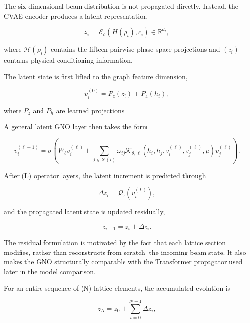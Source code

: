 The six-dimensional beam distribution is not propagated directly. Instead, the CVAE encoder produces a latent representation

\begin{equation}
\label{eq:119}
z_i=\mathcal E_{\phi}(H(\rho_i),c_i)\in\mathbb R^{d_z},
\end{equation}

where \(\mathcal{H} ( \rho_{i} )\) contains the fifteen pairwise phase-space projections and \(( c_{i} )\) contains physical conditioning information.

The latent state is first lifted to the graph feature dimension,

\begin{equation}
\label{eq:120}
v_i^{(0)}=P_z(z_i)+P_h(h_i),
\end{equation}

where \(P_{z}\) and \(P_{h}\) are learned projections.

A general latent GNO layer then takes the form

\begin{equation}
\label{eq:121}
v_i^{(\ell+1)}=\sigma\left(W_{\ell}v_i^{(\ell)}+\sum_{j\in\mathcal N(i)}\omega_{ij}\mathcal K_{\theta,\ell}(h_i,h_j,v_i^{(\ell)},v_j^{(\ell)},\mu)v_j^{(\ell)}\right).
\end{equation}

After (L) operator layers, the latent increment is predicted through

\begin{equation}
\label{eq:122}
\Delta z_i=\mathcal Q_z\left(v_i^{(L)}\right),
\end{equation}

and the propagated latent state is updated residually,

\begin{equation}
\label{eq:123}
z_{i+1}=z_i+\Delta z_i.
\end{equation}

The residual formulation is motivated by the fact that each lattice section modifies, rather than reconstructs from scratch, the incoming beam state. It also makes the GNO structurally comparable with the Transformer propagator used later in the model comparison.

For an entire sequence of (N) lattice elements, the accumulated evolution is

\begin{equation}
\label{eq:124}
z_N=z_0+\sum_{i=0}^{N-1}\Delta z_i,
\end{equation}

